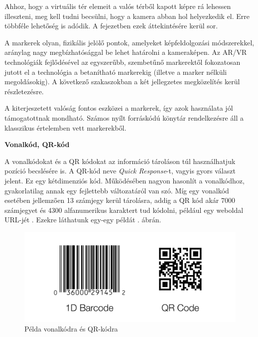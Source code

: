 
Ahhoz, hogy a virtuális tér elemeit a valós térből kapott képre rá lehessen illeszteni, meg kell tudni becsülni, hogy a kamera abban hol helyezkedik el.
Erre többféle lehetőség is adódik.
A fejezetben ezek áttekintésére kerül sor.


A markerek olyan, fizikális jelölő pontok, amelyeket képfeldolgozási módszerekkel, a\-rány\-lag nagy megbízhatósággal be lehet határolni a kameraképen.
Az AR/VR technológiák fejlődésével az egyszerűbb, szembetűnő markerektől fokozatosan jutott el a technológia a betanítható markerekig (illetve a marker nélküli megoldásokig).
A következő szakaszokban a két jellegzetes megközelítés kerül részletezésre.


A kiterjeszetett valóság fontos eszközei a markerek, így azok használata jól támogatottnak mondható. Számos nyílt forráskódú könytár rendelkezésre áll a klasszikus értelemben vett markerekből.

\bigskip

\noindent \textbf{Vonalkód, QR-kód}

\medskip

A vonalkódokat és a QR kódokat az információ tároláson túl használhatjuk pozíció becslésére is.
A QR-kód neve \textit{Quick Response}-t, vagyis gyors választ jelent.
Ez egy kétdimenziós kód. Működésében nagyon hasonlít a vonalkódhoz, gyakorlatilag annak egy fejlettebb változatáról van szó.
Míg egy vonalkód esetében jellemzően 13 számjegy kerül tárolásra, addig a QR kód akár 7000 számjegyet és 4300 alfanumerikus karaktert tud kódolni, például egy weboldal URL-jét \cite{tiwari2016introduction}.
Ezekre láthatunk egy-egy példát . ábrán.

\begin{figure}[htp]
    \centering
   	\includegraphics[scale=0.25]{images/qr_bar.png}
	\caption{Példa vonalkódra és QR-kódra}
	\label{fig:barcode}
\end{figure}

